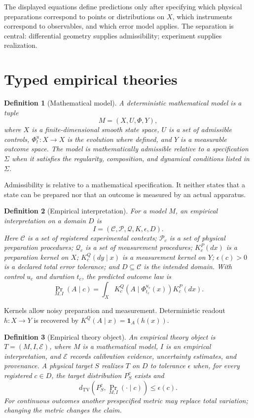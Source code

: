\documentclass[11pt]{article}
\newtheorem{definition}{Definition}[section]
\newcommand{\TV}{d_{\mathrm{TV}}}
\begin{document}
The displayed equations define predictions only after specifying which physical preparations correspond to points or distributions on $X$, which instruments correspond to observables, and which error model applies.  The separation is central: differential geometry supplies admissibility; experiment supplies realization.

\section{Typed empirical theories}

\begin{definition}[Mathematical model]
A deterministic mathematical model is a tuple
\[
 M=(X,U,\Phi,Y),
\]
where $X$ is a finite-dimensional smooth state space, $U$ is a set of admissible controls, $\Phi^u_t:X\to X$ is the evolution where defined, and $Y$ is a measurable outcome space.  The model is \emph{mathematically admissible} relative to a specification $\Sigma$ when it satisfies the regularity, composition, and dynamical conditions listed in $\Sigma$.
\end{definition}

Admissibility is relative to a mathematical specification.  It neither states that a state can be prepared nor that an outcome is measured by an actual apparatus.

\begin{definition}[Empirical interpretation]
For a model $M$, an empirical interpretation on a domain $D$ is
\[
 I=(\mathcal C,\mathcal P,\mathcal Q,K,\epsilon,D).
\]
Here $\mathcal C$ is a set of registered experimental contexts; $\mathcal P_c$ is a set of physical preparation procedures; $\mathcal Q_c$ is a set of measurement procedures; $K^P_c(dx)$ is a preparation kernel on $X$; $K^Q_c(dy\mid x)$ is a measurement kernel on $Y$; $\epsilon(c)>0$ is a declared total error tolerance; and $D\subseteq\mathcal C$ is the intended domain.  With control $u_c$ and duration $t_c$, the predicted outcome law is
\begin{equation}\label{eq:prediction}
 \Pr_{M,I}(A\mid c)=\int_X K^Q_c(A\mid\Phi^{u_c}_{t_c}(x))K^P_c(dx).
\end{equation}
\end{definition}

Kernels allow noisy preparation and measurement.  Deterministic readout $h:X\to Y$ is recovered by $K^Q(A\mid x)=\mathbf1_A(h(x))$.

\begin{definition}[Empirical theory object]
An empirical theory object is $T=(M,I,\mathcal E)$, where $M$ is a mathematical model, $I$ is an empirical interpretation, and $\mathcal E$ records calibration evidence, uncertainty estimates, and provenance.  A physical target $S$ \emph{realizes} $T$ on $D$ to tolerance $\epsilon$ when, for every registered $c\in D$, the target distribution $P_S^c$ exists and
\begin{equation}\label{eq:realize}
 \TV(P_S^c,\Pr_{M,I}(\cdot\mid c))\leq\epsilon(c).
\end{equation}
For continuous outcomes another prespecified metric may replace total variation; changing the metric changes the claim.
\end{definition}
\end{document}
